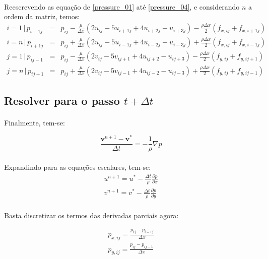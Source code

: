 \documentclass[poisson.tex]{subfiles}
\begin{document}
\paragraph{} Reescrevendo as equação de \ref{pressure_01} até \ref{pressure_04}, e considerando $n$ a ordem da matriz, temos:
\begin{eqnarray}
i=1 \,|\, p_{i-1j}&=&p_{ij}-\frac{\mu}{\Delta x}\left(2u_{ij}-5u_{i+1j}+4u_{i+2j}-u_{i+3j}\right)-\frac{\rho\Delta x}{2}(f_{x,ij}+f_{x,i+1j})\\
i=n \,|\, p_{i+1j}&=&p_{ij}+\frac{\mu}{\Delta x}\left(2u_{ij}-5u_{i-1j}+4u_{i-2j}-u_{i-3j}\right)+\frac{\rho\Delta x}{2}(f_{x,ij}+f_{x,i-1j})\\
j=1 \,|\, p_{ij-1}&=&p_{ij}-\frac{\mu}{\Delta x}\left(2v_{ij}-5v_{ij+1}+4u_{ij+2}-u_{ij+3}\right)-\frac{\rho\Delta x}{2}(f_{y,ij}+f_{y,ij+1})\\
j=n \,|\, p_{ij+1}&=&p_{ij}+\frac{\mu}{\Delta x}\left(2v_{ij}-5v_{ij-1}+4u_{ij-2}-u_{ij-3}\right)+\frac{\rho\Delta x}{2}(f_{y,ij}+f_{y,ij-1})
\end{eqnarray}
\subsection{Resolver para o passo $t+\Delta t$}
\paragraph{} Finalmente, tem-se: 

\begin{equation}
\frac{\textbf{v}^{n+1}-\textbf{v}^*}{\Delta t}=-\frac{1}{\rho}\nabla p
\end{equation}
\paragraph{} Expandindo para as equações escalares, tem-se:
\begin{eqnarray}
u^{n+1}=u^*-\frac{\Delta t}{\rho}\frac{\partial p}{\partial x}\\
v^{n+1}=v^*-\frac{\Delta t}{\rho}\frac{\partial p}{\partial y}
\end{eqnarray}
\paragraph{} Basta discretizar os termos das derivadas parciais agora:

\begin{eqnarray}
p_{x,ij}=\frac{p_{ij}-p_{i-1j}}{\Delta x}\\
p_{y,ij}=\frac{p_{ij}-p_{ij-1}}{\Delta x}
\end{eqnarray}
\end{document}
